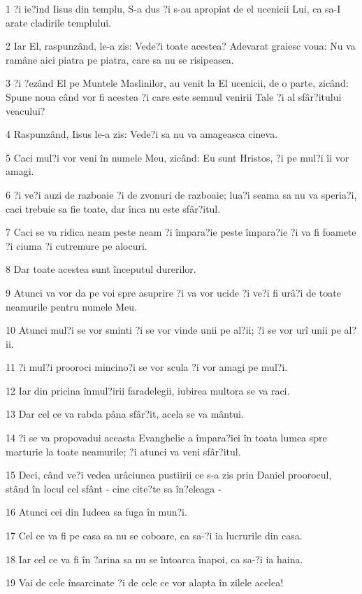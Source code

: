 \par 1 ?i ie?ind Iisus din templu, S-a dus ?i s-au apropiat de el ucenicii Lui, ca sa-I arate cladirile templului.
\par 2 Iar El, raspunzând, le-a zis: Vede?i toate acestea? Adevarat graiesc voua: Nu va ramâne aici piatra pe piatra, care sa nu se risipeasca.
\par 3 ?i ?ezând El pe Muntele Maslinilor, au venit la El ucenicii, de o parte, zicând: Spune noua când vor fi acestea ?i care este semnul venirii Tale ?i al sfâr?itului veacului?
\par 4 Raspunzând, Iisus le-a zis: Vede?i sa nu va amageasca cineva.
\par 5 Caci mul?i vor veni în numele Meu, zicând: Eu sunt Hristos, ?i pe mul?i îi vor amagi.
\par 6 ?i ve?i auzi de razboaie ?i de zvonuri de razboaie; lua?i seama sa nu va speria?i, caci trebuie sa fie toate, dar înca nu este sfâr?itul.
\par 7 Caci se va ridica neam peste neam ?i împara?ie peste împara?ie ?i va fi foamete ?i ciuma ?i cutremure pe alocuri.
\par 8 Dar toate acestea sunt începutul durerilor.
\par 9 Atunci va vor da pe voi spre asuprire ?i va vor ucide ?i ve?i fi urâ?i de toate neamurile pentru numele Meu.
\par 10 Atunci mul?i se vor sminti ?i se vor vinde unii pe al?ii; ?i se vor urî unii pe al?ii.
\par 11 ?i mul?i prooroci mincino?i se vor scula ?i vor amagi pe mul?i.
\par 12 Iar din pricina înmul?irii faradelegii, iubirea multora se va raci.
\par 13 Dar cel ce va rabda pâna sfâr?it, acela se va mântui.
\par 14 ?i se va propovadui aceasta Evanghelie a împara?iei în toata lumea spre marturie la toate neamurile; ?i atunci va veni sfâr?itul.
\par 15 Deci, când ve?i vedea urâciunea pustiirii ce s-a zis prin Daniel proorocul, stând în locul cel sfânt - cine cite?te sa în?eleaga -
\par 16 Atunci cei din Iudeea sa fuga în mun?i.
\par 17 Cel ce va fi pe casa sa nu se coboare, ca sa-?i ia lucrurile din casa.
\par 18 Iar cel ce va fi în ?arina sa nu se întoarca înapoi, ca sa-?i ia haina.
\par 19 Vai de cele însarcinate ?i de cele ce vor alapta în zilele acelea!
